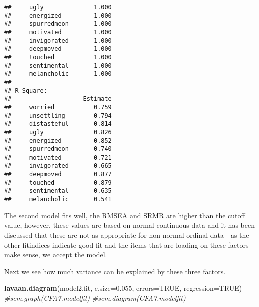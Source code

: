 \documentclass[
]{article}
\newenvironment{Shaded}{\begin{snugshade}}{\end{snugshade}}
\newcommand{\CommentTok}[1]{\textcolor[rgb]{0.56,0.35,0.01}{\textit{#1}}}
\newcommand{\DataTypeTok}[1]{\textcolor[rgb]{0.13,0.29,0.53}{#1}}
\newcommand{\FloatTok}[1]{\textcolor[rgb]{0.00,0.00,0.81}{#1}}
\newcommand{\KeywordTok}[1]{\textcolor[rgb]{0.13,0.29,0.53}{\textbf{#1}}}
\newcommand{\NormalTok}[1]{#1}
\newcommand{\OtherTok}[1]{\textcolor[rgb]{0.56,0.35,0.01}{#1}}
\begin{document}
\begin{verbatim}
##     ugly              1.000                           
##     energized         1.000                           
##     spurredmeon       1.000                           
##     motivated         1.000                           
##     invigorated       1.000                           
##     deepmoved         1.000                           
##     touched           1.000                           
##     sentimental       1.000                           
##     melancholic       1.000                           
## 
## R-Square:
##                    Estimate
##     worried           0.759
##     unsettling        0.794
##     distasteful       0.814
##     ugly              0.826
##     energized         0.852
##     spurredmeon       0.740
##     motivated         0.721
##     invigorated       0.665
##     deepmoved         0.877
##     touched           0.879
##     sentimental       0.635
##     melancholic       0.541
\end{verbatim}

The second model fits well, the RMSEA and SRMR are higher than the
cutoff value, however, these values are based on normal continuous data
and it has been discussed that these are not as appropriate for
non-normal ordinal data - as the other fitindices indicate good fit and
the items that are loading on these factors make sense, we accept the
model.

Next we see how much variance can be explained by these three factors.

\begin{Shaded}
\begin{Highlighting}[]
\KeywordTok{lavaan.diagram}\NormalTok{(model2.fit, }\DataTypeTok{e.size=}\FloatTok{0.055}\NormalTok{, }\DataTypeTok{errors=}\OtherTok{TRUE}\NormalTok{, }\DataTypeTok{regression=}\OtherTok{TRUE}\NormalTok{)}
\CommentTok{\#sem.graph(CFA7.modelfit)}
\CommentTok{\#sem.diagram(CFA7.modelfit)}
\end{Highlighting}
\end{Shaded}
\end{document}
